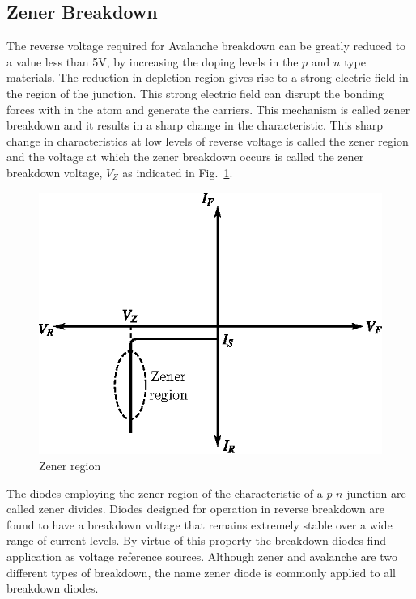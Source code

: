 \subsection{Zener Breakdown}\label{sec1.22.2}

The reverse voltage required for  Avalanche breakdown can be greatly reduced to a value less than 5V, by increasing the doping levels in the $p$ and $n$ type materials. The reduction in depletion region gives rise to a strong electric field in the region of the junction. This strong electric field can disrupt the bonding forces with in the atom and generate the carriers. This mechanism is called zener breakdown and it results in a sharp change in the characteristic. This sharp change in characteristics at low levels of reverse voltage is called the zener region and the voltage at which the zener breakdown occurs is called the zener breakdown voltage, $V_{Z}$ as indicated in Fig.~\ref{fig1.26}.
\begin{figure}[H]
\centering
\includegraphics[scale=.9]{chap1/fig1.26.eps}
\caption{Zener region}\label{fig1.26}
\end{figure}

The diodes employing the zener region of the characteristic of a $p$-$n$ junction are called zener divides. Diodes designed for operation in reverse breakdown are found to have a breakdown voltage that remains extremely stable over a wide range of current levels. By virtue of this property the breakdown diodes find application as voltage reference sources. Although zener and avalanche are two different types of breakdown, the name zener diode is commonly applied to all breakdown diodes.\\[-22pt]

